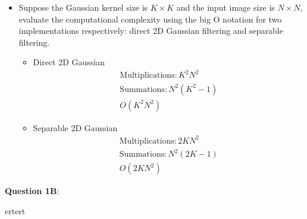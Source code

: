 \documentclass{article}
\begin{document}
\begin{enumerate}[label=\alph*)]
\begin{itemize}
            \item Suppose the Gaussian kernel size is $K \times K$ and the input
            image size is $N \times N$, evaluate the computational complexity using the big O notation for two
            implementations respectively: direct 2D Gaussian filtering and
            separable filtering.
            \begin{itemize}
                \item Direct 2D Gaussian
                \begin{gather*}
                    \text{Multiplications}: K^2 N^2 \\
                    \text{Summations}: N^2 (K^2 - 1) \\ 
                    O(K^2 N^2)
                \end{gather*}

                \item Separable 2D Gaussian
                \begin{gather*}
                    \text{Multiplications}: 2K N^2 \\
                    \text{Summations}: N^2 (2K - 1) \\ 
                    O(2K N^2)
                \end{gather*}
            \end{itemize}
        \end{itemize}
    \end{enumerate} 




    \textbf{Question 1B}: 
    
    ertert
\end{document}
